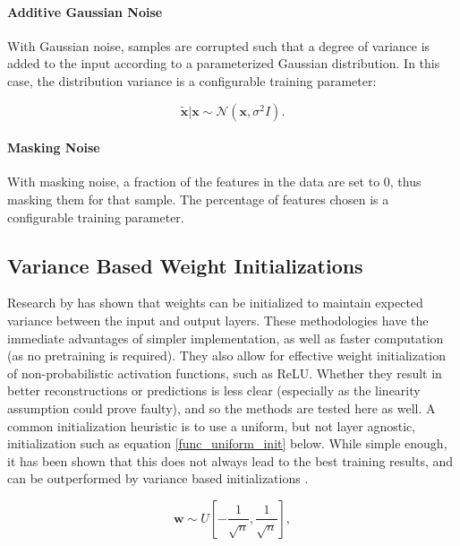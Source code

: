 \documentclass[a4paper,11pt,oneside]{article}
\theoremstyle{plain}
\theoremstyle{definition}
\begin{document}
	\paragraph{Additive Gaussian Noise}
	
	With Gaussian noise, samples are corrupted such that a degree of variance is added to the input according to a parameterized Gaussian distribution. In this case, the distribution variance is a configurable training parameter:
	
	\begin{equation}
	\mathbf{\tilde{{x}}} | \mathbf{x} \sim \mathcal{N}\left(\mathbf{x}, \sigma^{2} I\right) .
	\end{equation}
	
	\paragraph{Masking Noise}
	
	With masking noise, a fraction of the features in the data are set to 0, thus masking them for that sample. The percentage of features chosen is a configurable training parameter.
	
	\subsection{Variance Based Weight Initializations}\label{imp_weights}
	
	Research by \citet{He} has shown that weights can be initialized to maintain expected variance between the input and output layers. These methodologies have the immediate advantages of simpler implementation, as well as faster computation (as no pretraining is required). They also allow for effective weight initialization of non-probabilistic activation functions, such as ReLU. Whether they result in better reconstructions or predictions is less clear (especially as the linearity assumption could prove faulty), and so the methods are tested here as well. 
	\newline\newline
	A common initialization heuristic is to use a uniform, but not layer agnostic, initialization such as equation \eqref{func_uniform_init} below. While simple enough, it has been shown that this does not always lead to the best training results, and can be outperformed by variance based initializations \citep{Glorot}.
	
	\begin{equation}\label{func_uniform_init}
	\mathbf{w} \sim U\left[-\frac{1}{\sqrt{n}}, \frac{1}{\sqrt{n}}\right] ,
	\end{equation}
	
\end{document}
